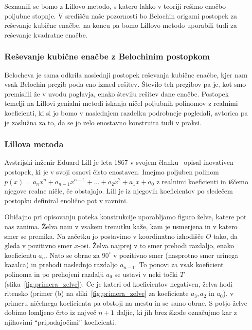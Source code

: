 Seznanili se bomo z Lillovo metodo, s katero lahko v teoriji rešimo enačbo poljubne stopnje. V središču naše pozornosti bo Belochin origami postopek za reševanje kubične enačbe, na koncu pa bomo Lillovo metodo uporabili tudi za reševanje kvadratne enačbe.

\subsubsection{Reševanje kubične enačbe z Belochinim postopkom}

Belocheva je sama odkrila naslednji postopek reševanja kubične enačbe, kjer nam vsak Belochin pregib poda eno izmed rešitev. Število teh pregibov pa je, kot smo premislili že v uvodu poglavja, enako številu rešitev dane enačbe. Postopek temelji na Lillovi genialni metodi iskanja ničel poljubnih polinomov z realnimi koeficienti, ki si jo bomo v naslednjem razdelku podrobneje pogledali, avtorica pa je zaslužna za to, da se jo zelo enostavno konstruira tudi v praksi.

\subsubsection*{Lillova metoda}

Avstrijski inženir Eduard Lill je leta 1867 v svojem članku~\cite{lill1867} opisal inovativen postopek, ki je v svoji osnovi čisto enostaven. Imejmo poljuben polinom $ p(x) = a_n x^n + a_{n-1} x^{n-1} + \ldots + a_2 x^2 + a_1 x + a_0 $ z realnimi koeficienti in iščemo njegove realne ničle, če obstajajo. Lill je iz njegovih koeficientov po sledečem postopku definiral enolično pot v ravnini. 

Običajno pri opisovanju poteka konstrukcije uporabljamo figuro želve, katere pot nas zanima. Želva nam v vsakem trenutku kaže, kam je usmerjena in v katero smer se premika. Na začetku jo postavimo v koordinatno izhodišče $O$ tako, da gleda v pozitivno smer $x$-osi. Želva najprej v to smer prehodi razdaljo, enako koeficientu $a_n$. Nato se obrne za $90^\circ$ v pozitivno smer (nasprotno smer urinega kazalca) in prehodi naslednjo razdaljo $a_{n-1}$. To ponovi za vsak koeficient polinoma in po prehojeni razdalji $a_0$ se ustavi v neki točki $T$ (slika~\ref{fig:primera_zelve}). Če je kateri od koeficientov negativen, želva hodi ritensko (primer (b) na sliki~\ref{fig:primera_zelve} za koeficiente $a_3, a_2$ in $a_0$), v primeru ničelnega koeficienta pa obstoji na mestu in se samo obrne. S potjo želve dobimo lomljeno črto iz največ $n+1$ daljic, ki jih brez škode označujmo kar z njihovimi ``pripadajočimi'' koeficienti.


